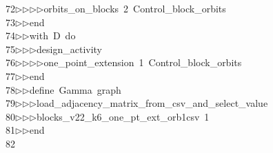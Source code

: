 \begin{tabbing}
72\>$\triangleright$\>$\triangleright$\>$\triangleright$\>$\triangleright$\>orbits\_on\_blocks\ 2\ Control\_block\_orbits\ \\[0pt]
73\>$\triangleright$\>$\triangleright$\>end\ \\[0pt]
74\>$\triangleright$\>$\triangleright$\>with\ D\ do\ \\[0pt]
75\>$\triangleright$\>$\triangleright$\>$\triangleright$\>design\_activity\ \\[0pt]
76\>$\triangleright$\>$\triangleright$\>$\triangleright$\>$\triangleright$\>one\_point\_extension\ 1\ Control\_block\_orbits\ \\[0pt]
77\>$\triangleright$\>$\triangleright$\>end\ \\[0pt]
78\>$\triangleright$\>$\triangleright$\>define\ Gamma\ graph\ \\[0pt]
79\>$\triangleright$\>$\triangleright$\>$\triangleright$\>load\_adjacency\_matrix\_from\_csv\_and\_select\_value\ \\[0pt]
80\>$\triangleright$\>$\triangleright$\>$\triangleright$\>blocks\_v22\_k6\_one\_pt\_ext\_orb1csv\ 1\ \\[0pt]
81\>$\triangleright$\>$\triangleright$\>end\\[0pt]
82\>\end{tabbing}
